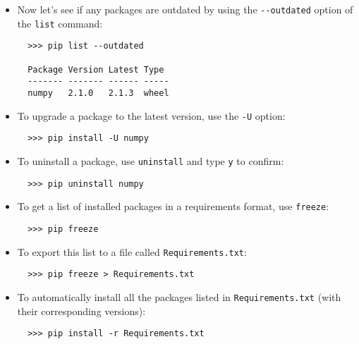 \documentclass{UNB-Physics-Assignment}
\begin{document}
\begin{itemize}
\item Now let's see if any packages are outdated by using the \verb"--outdated" option of the \verb"list" command:
\begin{verbatim}
  >>> pip list --outdated

  Package Version Latest Type
  ------- ------- ------ -----
  numpy   2.1.0   2.1.3  wheel
\end{verbatim}

\item To upgrade a package to the latest version, use the \verb"-U" option:
\begin{verbatim}
  >>> pip install -U numpy
\end{verbatim}

\item To uninstall a package, use \verb"uninstall"  and type \verb"y" to confirm:
\begin{verbatim}
  >>> pip uninstall numpy
\end{verbatim}

\item To get a list of installed packages in a requirements format, use \verb"freeze":
\begin{verbatim}
  >>> pip freeze
\end{verbatim}

\item To export this list to a file called \verb"Requirements.txt":
\begin{verbatim}
  >>> pip freeze > Requirements.txt
\end{verbatim}

\item To automatically install all the packages listed in \verb"Requirements.txt" (with their corresponding versions):
\begin{verbatim}
  >>> pip install -r Requirements.txt
\end{verbatim}

\end{itemize}
\end{document}

